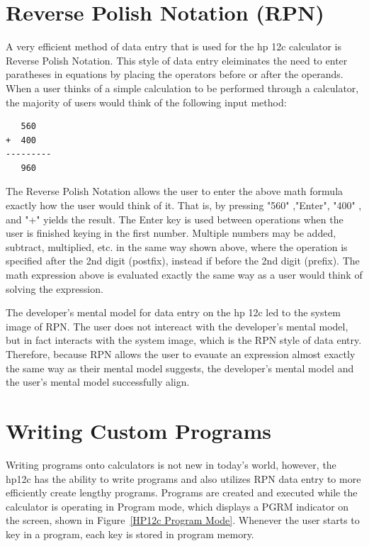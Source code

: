 \documentclass{article}
\begin{document}
\section{Reverse Polish Notation (RPN)}

A very efficient method of data entry that is used for the hp 12c calculator is Reverse Polish Notation. This style of data entry eleiminates the need to enter paratheses in equations by placing the operators before or after the operands. When a user thinks of a simple calculation to be performed through a calculator, the majority of users would think of the following input method:
\begin{verbatim}
   560
+  400
---------
   960
\end{verbatim}
The Reverse Polish Notation allows the user to enter the above math formula exactly how the user would think of it. That is, by pressing "560" ,"Enter",  "400" , and "+"  yields the result. The Enter key is used between operations when the user is finished keying in the first number. Multiple numbers may be added, subtract, multiplied, etc. in the same way shown above, where the operation is specified after the 2nd digit (postfix), instead if before the 2nd digit (prefix). The math expression above is evaluated exactly the same way as a user would think of solving the expression.

The developer's mental model for data entry on the hp 12c led to the system image of RPN. The user does not intereact with the developer's mental model, but in fact interacts with the system image, which is the RPN style of data entry. Therefore, because RPN allows the user to evauate an expression almost exactly the same way as their mental model suggests, the developer's mental model and the user's mental model successfully align.

\section{Writing Custom Programs}

Writing programs onto calculators is not new in today's world, however, the hp12c has the ability to write programs and also utilizes RPN data entry to more efficiently create lengthy programs. Programs are created and executed while the calculator is operating in Program mode, which displays a PGRM indicator on the screen, shown in Figure~\ref{HP12c Program Mode}. Whenever the user starts to key in a program, each key is stored in program memory. 
\end{document}
